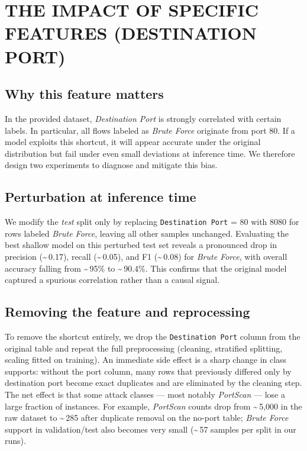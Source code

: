 
\section{THE IMPACT OF SPECIFIC FEATURES (DESTINATION PORT)} \label{sec:impact-dest-port}

    \subsection{Why this feature matters}

        In the provided dataset, \emph{Destination Port} is strongly correlated with certain labels. 
        In particular, all flows labeled as \emph{Brute Force} originate from port 80. 
        If a model exploits this shortcut, it will appear accurate under the original distribution but fail under even small deviations at inference time. 
        We therefore design two experiments to diagnose and mitigate this bias.

    \subsection{Perturbation at inference time}

        We modify the \emph{test} split only by replacing \texttt{Destination Port} = 80 with 8080 for rows labeled \emph{Brute Force}, leaving all other samples unchanged. 
        Evaluating the best shallow model on this perturbed test set reveals a pronounced drop in precision (\textasciitilde\,0.17), recall (\textasciitilde\,0.05), and F1 (\textasciitilde\,0.08) for \emph{Brute Force}, with overall accuracy falling from \textasciitilde\,95\% to \textasciitilde\,90.4\%. 
        This confirms that the original model captured a spurious correlation rather than a causal signal.

    \subsection{Removing the feature and reprocessing}

        To remove the shortcut entirely, we drop the \texttt{Destination Port} column from the original table and repeat the full preprocessing (cleaning, stratified splitting, scaling fitted on training). 
        An immediate side effect is a sharp change in class supports: without the port column, many rows that previously differed only by destination port become exact duplicates and are eliminated by the cleaning step. 
        The net effect is that some attack classes --- most notably \emph{PortScan} --- lose a large fraction of instances. 
        For example, \emph{PortScan} counts drop from \textasciitilde\,5,000 in the raw dataset to \textasciitilde\,285 after duplicate removal on the no-port table; \emph{Brute Force} support in validation/test also becomes very small (\textasciitilde\,57 samples per split in our runs).

